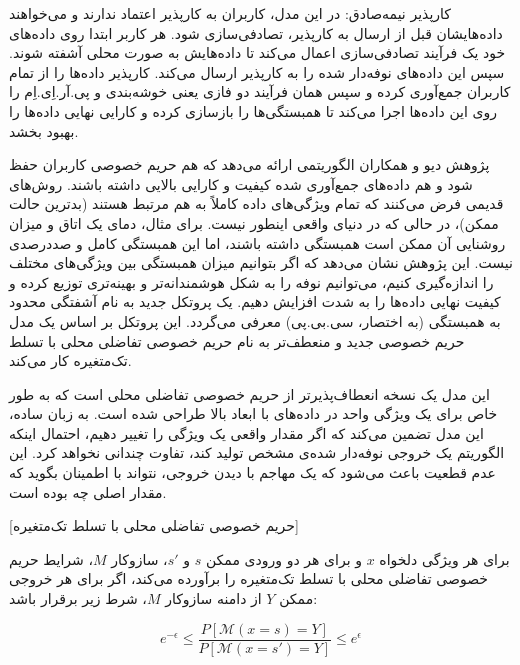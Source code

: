  کارپذیر نیمه‌صادق: در این مدل، کاربران به کارپذیر اعتماد ندارند و می‌خواهند داده‌هایشان قبل از ارسال به کارپذیر، تصادفی‌سازی شود. هر کاربر ابتدا روی داده‌های خود یک فرآیند تصادفی‌سازی اعمال می‌کند تا داده‌هایش به صورت محلی آشفته شوند. سپس این داده‌های نوفه‌دار شده را به کارپذیر ارسال می‌کند. کارپذیر داده‌ها را از تمام کاربران جمع‌آوری کرده و سپس همان فرآیند دو فازی یعنی خوشه‌بندی و  پی.آر.اِی.اِم را روی این داده‌ها اجرا می‌کند تا همبستگی‌ها را بازسازی کرده و کارایی نهایی داده‌ها را بهبود بخشد.



پژوهش دیو و همکاران  الگوریتمی ارائه می‌دهد که هم حریم خصوصی کاربران حفظ شود و هم داده‌های جمع‌آوری شده کیفیت و کارایی بالایی داشته باشند. روش‌های قدیمی فرض می‌کنند که تمام ویژگی‌های داده کاملاً به هم مرتبط هستند (بدترین حالت ممکن)، در حالی که در دنیای واقعی اینطور نیست. برای مثال، دمای یک اتاق و میزان روشنایی آن ممکن است همبستگی داشته باشند، اما این همبستگی کامل و صددرصدی نیست. این پژوهش نشان می‌دهد که اگر بتوانیم میزان همبستگی بین ویژگی‌های مختلف را اندازه‌گیری کنیم، می‌توانیم نوفه را به شکل هوشمندانه‌تر و بهینه‌تری توزیع کرده و کیفیت نهایی داده‌ها را به شدت افزایش دهیم. یک پروتکل جدید به نام آشفتگی محدود به همبستگی (به اختصار، سی.بی.پی) معرفی می‌گردد. این پروتکل بر اساس یک مدل حریم خصوصی جدید و منعطف‌تر به نام حریم خصوصی تفاضلی محلی با تسلط تک‌متغیره کار می‌کند. 

این مدل یک نسخه انعطاف‌پذیرتر از حریم خصوصی تفاضلی محلی است که به طور خاص برای یک ویژگی واحد در داده‌های با ابعاد بالا طراحی شده است. به زبان ساده، این مدل تضمین می‌کند که اگر مقدار واقعی یک ویژگی را تغییر دهیم، احتمال اینکه الگوریتم یک خروجی نوفه‌دار شده‌ی مشخص تولید کند، تفاوت چندانی نخواهد کرد. این عدم قطعیت باعث می‌شود که یک مهاجم با دیدن خروجی، نتواند با اطمینان بگوید که مقدار اصلی چه بوده است.

[حریم خصوصی تفاضلی محلی با تسلط تک‌متغیره]

برای هر ویژگی دلخواه $x$ و برای هر دو ورودی ممکن $s$ و $s'$، سازوکار $M$، شرایط حریم خصوصی تفاضلی محلی با تسلط تک‌متغیره را برآورده می‌کند، اگر برای هر خروجی ممکن $Y$ از دامنه سازوکار $M$، شرط زیر برقرار باشد:

\begin{equation}
e^{-\epsilon} \le \frac{P[\mathcal{M}(x = s) = Y]}{P[\mathcal{M}(x = s') = Y]} \le e^{\epsilon}
\end{equation}

